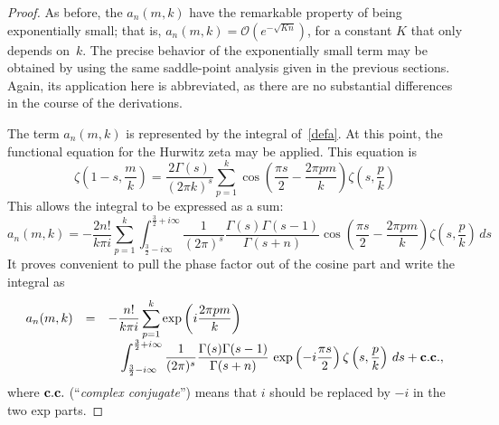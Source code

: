 \documentclass{amsart}
\def\ds{\displaystyle}
\begin{document}
\begin{proof}
As before,
the $a_n(m,k)$ have the remarkable property of being exponentially
small; that is, 
$ a_{n}(m,k)=\mathcal{O}\left(e^{-\sqrt{Kn}}\right)$,
 for a constant $K$ that only depends on~$k$. 
The precise behavior of the exponentially small term may be obtained 
by using the same saddle-point analysis given in the previous
sections. Again, its application here is abbreviated, as there
are no substantial differences in the course of the derivations.

The term $a_{n}(m,k)$ is represented by the integral of~\eqref{defa}.
At this point, the functional equation for the Hurwitz zeta may be
applied. This equation is 
\begin{equation}
\zeta\left(1-s,\frac{m}{k}\right)
=\frac{2\Gamma(s)}{(2\pi k)^{s}}
\sum_{p=1}^{k}\cos\left(\frac{\pi s}{2}-\frac{2\pi pm}{k}\right)
\zeta\left(s,\frac{p}{k}\right)
\end{equation}
 This allows the integral to be expressed as a sum:
\begin{equation*}
a_{n}(m,k)=-\frac{2n!}{k\pi i}\sum_{p=1}^{k}
\int_{\frac{3}{2}-i\infty}^{\frac{3}{2}+i\infty}
\frac{1}{(2\pi)^{s}}\frac{\Gamma(s)\Gamma(s-1)}{\Gamma(s+n)}
\cos\left(\frac{\pi s}{2}-\frac{2\pi pm}{k}\right)
\zeta\left(s,\frac{p}{k}\right)\, ds
\end{equation*}
 It proves  convenient to pull the phase factor out of the
cosine part %
and write the integral as 
\begin{equation*}
\begin{array}{lll}
a_{n}(m,k) & = & \ds -\frac{n!}{k\pi i}
\sum_{p=1}^{k}\exp\left(i\frac{2\pi pm}{k}\right) \\
 & & \quad \ds
\int_{\frac{3}{2}-i\infty}^{\frac{3}{2}+i\infty}
\frac{1}{(2\pi)^{s}}\frac{\Gamma(s)\Gamma(s-1)}{\Gamma(s+n)}\,
\exp\left(-i\frac{\pi s}{2}\right)
\zeta\left(s,\frac{p}{k}\right)\, ds   +{\bf c.c.},
\end{array}
\label{eq:two-integrals}
\end{equation*}
 where ${\bf c.c.}$ (``\emph{complex conjugate}'') means that $i$ should be replaced by $-i$ in the
two exp parts.



\end{proof}
\end{document}
